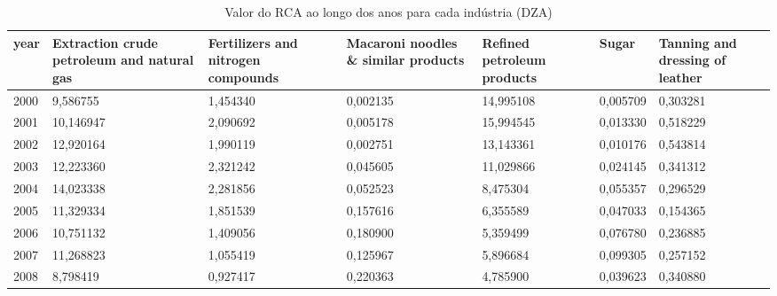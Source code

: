\begin{table}
\centering
\caption{Valor do RCA ao longo dos anos para cada indústria (DZA)}
\begin{tabular}{p{1cm}p{2cm}p{2cm}p{2cm}p{2cm}p{2cm}p{2cm}}
\toprule
 year &  Extraction crude petroleum and natural gas &  Fertilizers and nitrogen compounds &  Macaroni noodles \& similar products &  Refined petroleum products &    Sugar &  Tanning and dressing of leather \\
\midrule
 2000 &                                    9,586755 &                            1,454340 &                             0,002135 &                   14,995108 & 0,005709 &                         0,303281 \\
 2001 &                                   10,146947 &                            2,090692 &                             0,005178 &                   15,994545 & 0,013330 &                         0,518229 \\
 2002 &                                   12,920164 &                            1,990119 &                             0,002751 &                   13,143361 & 0,010176 &                         0,543814 \\
 2003 &                                   12,223360 &                            2,321242 &                             0,045605 &                   11,029866 & 0,024145 &                         0,341312 \\
 2004 &                                   14,023338 &                            2,281856 &                             0,052523 &                    8,475304 & 0,055357 &                         0,296529 \\
 2005 &                                   11,329334 &                            1,851539 &                             0,157616 &                    6,355589 & 0,047033 &                         0,154365 \\
 2006 &                                   10,751132 &                            1,409056 &                             0,180900 &                    5,359499 & 0,076780 &                         0,236885 \\
 2007 &                                   11,268823 &                            1,055419 &                             0,125967 &                    5,896684 & 0,099305 &                         0,257152 \\
 2008 &                                    8,798419 &                            0,927417 &                             0,220363 &                    4,785900 & 0,039623 &                         0,340880 \\

\end{tabular}
\end{table}
